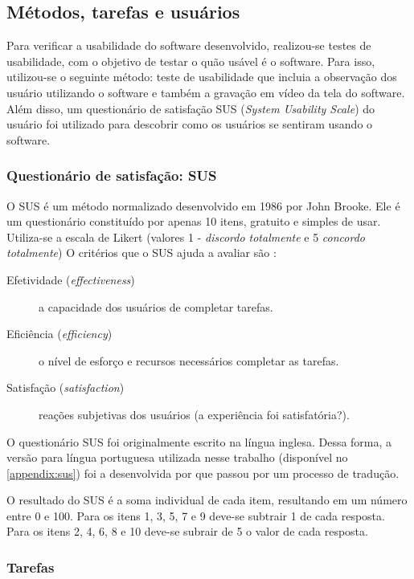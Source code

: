 \subsection{Métodos, tarefas e usuários}

Para verificar a usabilidade do software desenvolvido, realizou-se testes de usabilidade, com o
objetivo de testar o quão usável é o software. Para isso, utilizou-se o seguinte método: teste de usabilidade
que incluia a observação dos usuário utilizando o software e também a gravação em vídeo da tela do
software. Além disso, um questionário de satisfação SUS (\textit{System Usability Scale}) do usuário foi utilizado para descobrir como
os usuários se sentiram usando o software.

\subsubsection{Questionário de satisfação: SUS}\label{sub:sus}

O SUS é um método normalizado desenvolvido em 1986 por John Brooke.
Ele é um questionário constituído por apenas 10 itens, gratuito e simples de usar.
Utiliza-se a escala de Likert (valores 1 - \textit{discordo totalmente} e 5 \textit{concordo totalmente})
O critérios que o SUS ajuda a avaliar são \cite{brooke1996sus}:

\begin{description}
  \item[Efetividade (\textit{effectiveness})] a capacidade dos usuários de completar tarefas.
  \item[Eficiência (\textit{efficiency})] o nível de esforço e recursos necessários completar as tarefas.
  \item[Satisfação (\textit{satisfaction})] reações subjetivas dos usuários (a experiência foi satisfatória?).
\end{description}

O questionário SUS foi originalmente escrito na língua inglesa. Dessa forma, a versão para língua portuguesa
utilizada nesse trabalho (disponível no \autoref{appendix:sus}) foi a desenvolvida por  que passou por um processo
de tradução.

O resultado do SUS é a soma individual de cada item, resultando em um número entre 0 e 100.
Para os itens 1, 3, 5, 7 e 9 deve-se subtrair 1 de cada resposta. Para os itens 2, 4, 6, 8 e 10 deve-se
subrair de 5 o valor de cada resposta.

\subsubsection{Tarefas}

